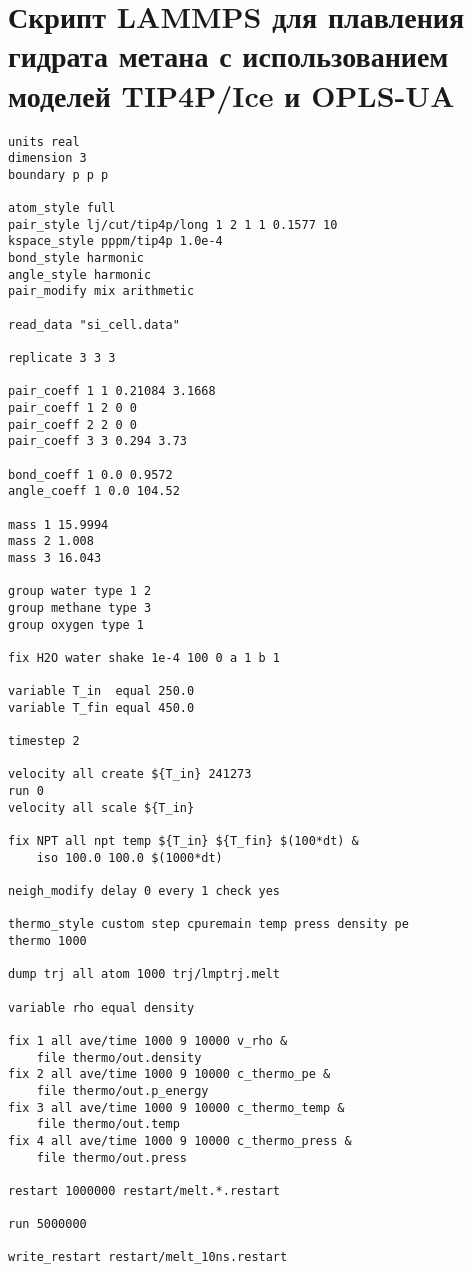 \section*{Скрипт LAMMPS для плавления гидрата метана с использованием моделей TIP4P/Ice и OPLS-UA}
\begin{lstlisting}[basicstyle=\ttfamily]
units real
dimension 3
boundary p p p

atom_style full
pair_style lj/cut/tip4p/long 1 2 1 1 0.1577 10
kspace_style pppm/tip4p 1.0e-4
bond_style harmonic
angle_style harmonic
pair_modify mix arithmetic

read_data "si_cell.data"

replicate 3 3 3

pair_coeff 1 1 0.21084 3.1668
pair_coeff 1 2 0 0
pair_coeff 2 2 0 0
pair_coeff 3 3 0.294 3.73

bond_coeff 1 0.0 0.9572
angle_coeff 1 0.0 104.52

mass 1 15.9994
mass 2 1.008
mass 3 16.043

group water type 1 2
group methane type 3
group oxygen type 1

fix H2O water shake 1e-4 100 0 a 1 b 1

variable T_in  equal 250.0
variable T_fin equal 450.0

timestep 2

velocity all create ${T_in} 241273
run 0
velocity all scale ${T_in}

fix NPT all npt temp ${T_in} ${T_fin} $(100*dt) &
    iso 100.0 100.0 $(1000*dt)

neigh_modify delay 0 every 1 check yes

thermo_style custom step cpuremain temp press density pe
thermo 1000

dump trj all atom 1000 trj/lmptrj.melt

variable rho equal density

fix 1 all ave/time 1000 9 10000 v_rho &
    file thermo/out.density
fix 2 all ave/time 1000 9 10000 c_thermo_pe &
    file thermo/out.p_energy
fix 3 all ave/time 1000 9 10000 c_thermo_temp &
    file thermo/out.temp
fix 4 all ave/time 1000 9 10000 c_thermo_press &
    file thermo/out.press

restart 1000000 restart/melt.*.restart

run 5000000

write_restart restart/melt_10ns.restart
\end{lstlisting}